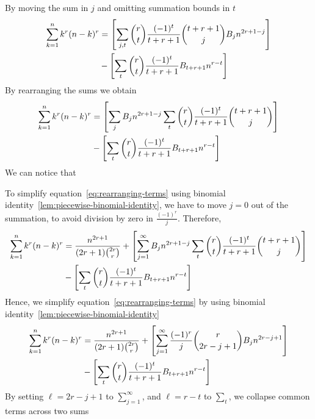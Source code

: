 By moving the sum in $j$ and omitting summation bounds in $t$
\begin{align*}
    \sum_{k=1}^{n} k^{r} (n-k)^{r}
    &= \left[ \sum_{j, t} \binom{r}{t} \frac{(-1)^t}{t+r+1} \binom{t+r+1}{j} {B}\sb{j} n^{2r+1-j}  \right] \\
    &- \left[ \sum_{t} \binom{r}{t} \frac{(-1)^t}{t+r+1} {B}\sb{t+r+1} n^{r-t} \right]
\end{align*}
By rearranging the sums we obtain
\begin{align}
    \label{eq:rearranging-terms}
    \sum_{k=1}^{n} k^{r} (n-k)^{r}
    &= \left[ \sum_{j} {B}\sb{j} n^{2r+1-j} \sum_{t} \binom{r}{t} \frac{(-1)^t}{t+r+1} \binom{t+r+1}{j}  \right] \\
    &- \left[ \sum_{t} \binom{r}{t} \frac{(-1)^t}{t+r+1} {B}\sb{t+r+1} n^{r-t} \right] \nonumber
\end{align}
We can notice that

To simplify equation~\eqref{eq:rearranging-terms} using binomial identity~\eqref{lem:piecewise-binomial-identity},
we have to move $j=0$ out of the summation,
to avoid division by zero in $\frac{(-1)^r}{j}$.
Therefore,
\begin{equation*}
    \begin{split}
        \sum_{k=1}^{n} k^{r} (n-k)^{r}
        &= \frac{n^{2r+1}}{(2r+1) \binom{2r}r}
        + \left[ \sum_{j = 1}^{\infty} {B}\sb{j} n^{2r+1-j} \sum_{t} \binom{r}{t} \frac{(-1)^t}{t+r+1} \binom{t+r+1}{j} \right] \\
        &- \left[ \sum_{t} \binom{r}{t} \frac{(-1)^t}{t+r+1} {B}\sb{t+r+1} n^{r-t} \right]
    \end{split}
\end{equation*}
Hence, we simplify equation~\eqref{eq:rearranging-terms} by using binomial identity~\eqref{lem:piecewise-binomial-identity}
\begin{equation*}
    \begin{split}
        \sum_{k=1}^{n} k^{r} (n-k)^{r}
        &= \frac{n^{2r+1}}{(2r+1) \binom{2r}r}
        + \left[ \sum_{j=1}^{\infty} \frac{(-1)^r}{j} \binom{r}{2r-j+1} {B}\sb{j} n^{2r-j+1} \right] \\
        &- \left[ \sum_{t} \binom{r}{t} \frac{(-1)^t}{t+r+1} {B}\sb{t+r+1} n^{r-t} \right]
    \end{split}
\end{equation*}
By setting $\ell=2r-j+1$ to $\sum_{j=1}^{\infty}$, and $\ell=r-t$ to $\sum_{t}$,
we collapse common terms across two sums
